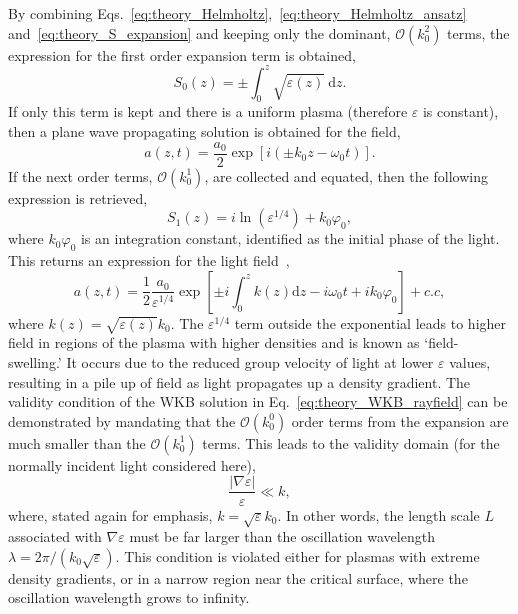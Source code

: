By combining Eqs.~\ref{eq:theory_Helmholtz},~\ref{eq:theory_Helmholtz_ansatz} and~\ref{eq:theory_S_expansion} and keeping only the dominant, $\mathcal{O}(k_0^2)$ terms, the expression for the first order expansion term is obtained,
\begin{equation}
    S_0(z) = \pm \int_0^z \sqrt{\varepsilon(z)}\ \text{d}z.
\end{equation}
If only this term is kept and there is a uniform plasma (therefore $\varepsilon$ is constant), then a plane wave propagating solution is obtained for the field,
\begin{equation}
    a(z,t) = \frac{a_0}{2} \exp{\left[  i (\pm k_0 z - \omega_0 t )\right]}.
\end{equation}
If the next order terms, $\mathcal{O}(k_0^1)$, are collected and equated, then the following expression is retrieved,
\begin{equation}
    S_1(z) = i \ln{\left( \varepsilon^{1/4} \right)} + k_0 \varphi_0,
\end{equation}
where $k_0\varphi_0$ is an integration constant, identified as the initial phase of the light.
This returns an expression for the light field~\cite{michel_introduction_2023},
\begin{equation}
    \label{eq:theory_WKB_rayfield}
    a(z,t) = \frac{1}{2}\frac{a_0}{\varepsilon^{1/4}}\exp{ \left[ \pm i \int_0^z k(z) \text{d}z - i\omega_0 t +ik_0\varphi_0 \right] } + c.c,
\end{equation}
where $k(z)=\sqrt{\varepsilon(z)}k_0$.
The $\varepsilon^{1/4}$ term outside the exponential leads to higher field in regions of the plasma with higher densities and is known as `field-swelling.'
It occurs due to the reduced group velocity of light at lower $\varepsilon$ values, resulting in a pile up of field as light propagates up a density gradient.
The validity condition of the WKB solution in Eq.~\ref{eq:theory_WKB_rayfield} can be demonstrated by mandating that the $\mathcal{O}(k_0^0)$ order terms from the expansion are much smaller than the $\mathcal{O}(k_0^1)$ terms.
This leads to the validity domain (for the normally incident light considered here),
\begin{equation}
    \frac{|\nabla \varepsilon|}{\varepsilon} \ll k,
\end{equation}
where, stated again for emphasis, $k=\sqrt{\varepsilon}k_0$.
In other words, the length scale $L$ associated with $\nabla\varepsilon$ must be far larger than the oscillation wavelength $\lambda = 2\pi/(k_0\sqrt{\varepsilon})$.
This condition is violated either for plasmas with extreme density gradients, or in a narrow region near the critical surface, where the oscillation wavelength grows to infinity.

